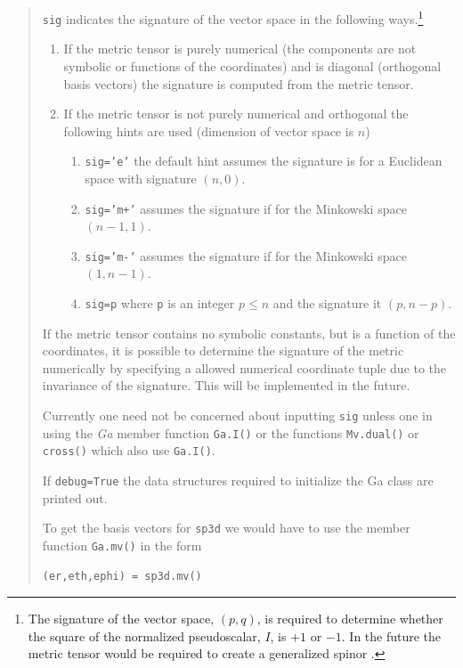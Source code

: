 \documentclass[12pt]{report}
\newcommand{\T}[1]{\texttt{#1}}
\begin{document}
\begin{quote}
   \T{sig} indicates the signature of the vector space in the following ways.\footnote{The 
   signature of the vector space, $(p,q)$, is required to determine whether the square of
   the normalized pseudoscalar, $I$, is $+1$ or $-1$. In the future the metric tensor would
   be required to create a generalized spinor \cite[p.~106]{Hestenes}.}
   \begin{enumerate}
       \item If the metric tensor is purely numerical (the components are not symbolic or 
             functions of the coordinates) and is diagonal (orthogonal basis vectors) the 
             signature is computed from the metric tensor.
       \item If the metric tensor is not purely numerical and orthogonal the following hints
             are used (dimension of vector space is $n$)
       \begin{enumerate}
       		\item \T{sig='e'} the default hint assumes the signature is for a Euclidean space
       		      with signature $(n,0)$.
       		\item \T{sig='m+'} assumes the signature if for the Minkowski space $(n-1,1)$.
       		\item \T{sig='m-'} assumes the signature if for the Minkowski space $(1,n-1)$.
       		\item \T{sig=p} where \T{p} is an integer $p\le n$ and the signature it $(p,n-p)$. 
       \end{enumerate}
   \end{enumerate}
   If the metric tensor contains no symbolic constants, but is a function of the coordinates, it is
   possible to determine the signature of the metric numerically by specifying a allowed numerical
   coordinate tuple due to the invariance of the signature.  This will be implemented in the future.
   
   Currently one need not be concerned about inputting \T{sig} unless one in using the \emph{Ga} member
   function \T{Ga.I()} or the functions \T{Mv.dual()} or \T{cross()} which also use \T{Ga.I()}.

   If \T{debug=True} the data structures required to initialize the Ga class
   are printed out.

   To get the basis vectors for \T{sp3d} we would have to use the member function
   \T{Ga.mv()} in the form
   \begin{lstlisting}[numbers=none]
    (er,eth,ephi) = sp3d.mv()
   \end{lstlisting}
\end{quote}
\end{document}
